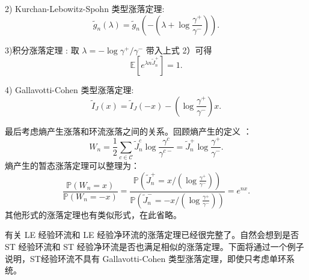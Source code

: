 2) Kurchan-Lebowitz-Spohn 类型涨落定理:
\begin{equation*}
\tilde{g}_n(\lambda)=\tilde{g}_n\left(-\left(\lambda+\log\frac{\gamma^+}{\gamma^-}\right)\right).
\end{equation*}

3)积分涨落定理 : 取 $\lambda = -\log \gamma^+/\gamma^-$ 带入上式 2）可得
\begin{equation*}
\mathbb{E}\left[e^{\lambda n\tilde{J}^+_n}\right]=1.
\end{equation*}

4) Gallavotti-Cohen 类型涨落定理:
\begin{equation*}
\tilde{I}_J(x)=\tilde{I}_J(-x)-\left(\log\frac{\gamma^+}{\gamma^-}\right)x.
\end{equation*}

最后考虑熵产生涨落和环流涨落之间的关系。回顾熵产生的定义 \cite{jiang2004mathematical}：
\begin{equation*}
	W_n=\frac{1}{2}\sum_{c\in\mathcal{C}}\tilde{J}^c_n\log\frac{\gamma^c}{\gamma^{c-}}=\tilde{J}^+_n\log\frac{\gamma^+}{\gamma^-}.
\end{equation*}
熵产生的暂态涨落定理可以整理为：
\begin{equation*}
	\frac{\mathbb{P}(W_n=x)}{\mathbb{P}(W_n=-x)}
	= \frac{\mathbb{P}(\tilde{J}^+_n=x/(\log\frac{\gamma^+}{\gamma^-}))}{\mathbb{P}(\tilde{J}^-_n=-x/(\log\frac{\gamma^+}{\gamma^-}))} = e^{nx}.
\end{equation*}
其他形式的涨落定理也有类似形式，在此省略。

有关 LE 经验环流和 LE 经验净环流的涨落定理已经很完整了。自然会想到是否 ST 经验环流和 ST 经验净环流是否也满足相似的涨落定理。下面将通过一个例子说明，ST经验环流不具有 Gallavotti-Cohen 类型涨落定理，即使只考虑单环系统。

